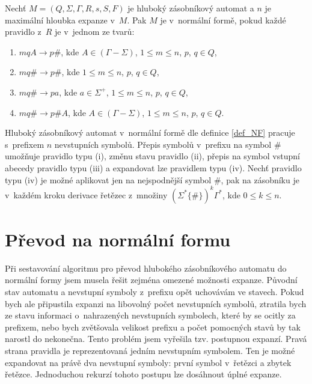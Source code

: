 \begin{Def}\label{def_NF}
Nechť $M = (Q,\Sigma,\Gamma, R, s, S , F)$ je hluboký zásobníkový automat
a $n$ je maximální hloubka expanze v~$M$.
Pak $M$ je v~normální formě, pokud každé pravidlo z~$R$ je v~jednom ze tvarů:

\begin{enumerate}
\renewcommand{\labelenumi}{(\roman{enumi})}

\item $mqA \rightarrow p\#$, kde $A \in (\Gamma - \Sigma)$, $1 \le m \le n$, $p$, $q \in Q$,
\item $mq\# \rightarrow p\#$, kde $1 \le m \le n$, $p$, $q \in Q$,
\item $mq\# \rightarrow pa$, kde $a \in {\Sigma}^+$, $1 \le m \le n$, $p$, $q \in Q$,
\item $mq\# \rightarrow p\#A$, kde $A \in (\Gamma - \Sigma)$, $1 \le m \le n$, $p$, $q \in Q$.

\end{enumerate}

\end{Def}
\medskip
Hluboký zásobníkový automat v~normální formě dle definice \ref{def_NF} pracuje s~prefixem $n$ nevstupních symbolů. Přepis symbolů v~prefixu na symbol $\#$ umožňuje pravidlo typu (i), změnu stavu pravidlo (ii), přepis na symbol vstupní abecedy pravidlo typu (iii) a expandovat lze pravidlem typu (iv). Nechť pravidlo typu (iv) je možné aplikovat jen na nejspodnější symbol $\#$, pak na zásobníku je v~každém kroku derivace řetězec z~množiny $ ( \Sigma^* \{ \# \} )^k  \Gamma^*$, kde $0 \le k \le n$. 

\section{Převod na normální formu}

Při sestavování algoritmu pro převod hlubokého zásobníkového automatu do normální formy jsem musela řešit zejména omezené možnosti expanze. Původní stav automatu a nevstupní symboly z~prefixu opět uchovávám ve stavech. Pokud bych ale připustila expanzi na libovolný počet nevstupních symbolů, ztratila bych ze stavu informaci o~nahrazených nevstupních symbolech, které by se ocitly za prefixem, nebo bych zvětšovala velikost prefixu a počet pomocných stavů by tak narostl do nekonečna. Tento problém jsem vyřešila tzv. postupnou expanzí. Pravá strana pravidla je reprezentovaná jedním nevstupním symbolem. Ten je možné expandovat na právě dva nevstupní symboly: první symbol v~řetězci a zbytek řetězce. Jednoduchou rekurzí tohoto postupu lze dosáhnout úplné expanze.

